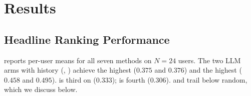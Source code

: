 \section{Results}
\label{sec:results}

\subsection{Headline Ranking Performance}
\label{sec:headline}

 reports per-user means for all seven methods on $N{=}24$ users. The two LLM arms with history (\claudehist, \gpthist) achieve the highest \ndcg ($0.375$ and $0.376$) and the highest \mrr ($0.458$ and $0.495$). \cbf is third on \ndcg ($0.333$); \itemknn is fourth ($0.306$). \popmethod and \claudenohist trail below random, which we discuss below.

\begin{table}[t]
    \centering
    \caption{Per-user mean of each metric on $N{=}24$ users; median across $3$ LLM runs at $T{=}0$. Higher is better for \recall, \ndcg, \mrr, \longtail, \genrediv; lower is better for \arp. Best LLM and best classical entry per metric in \textbf{bold}.}
    \label{tab:main}
\end{table}


